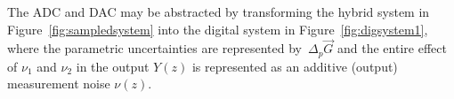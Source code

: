 \documentclass{sig-alternate-05-2015}
\begin{document}
The ADC and DAC may be abstracted by transforming the hybrid system in
Figure~\ref{fig:sampledsystem} into the digital system in
Figure~\ref{fig:digsystem1}, where the parametric uncertainties are
represented by~$\Delta_p \vec{G}$
%
%
and the entire effect of $\nu_{1}$ and $\nu_{2}$ in the output $Y(z)$ is
represented as an additive (output) measurement noise $\nu(z)$.

%
\end{document}
